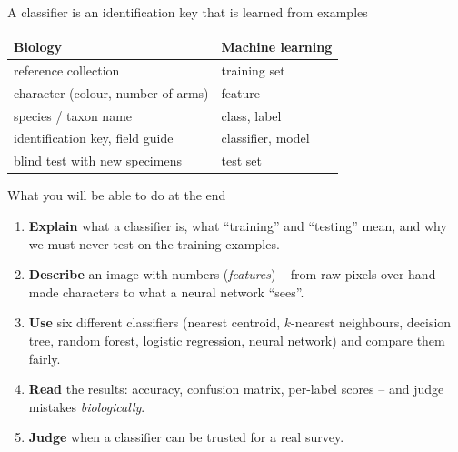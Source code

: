 \documentclass[aspectratio=169,11pt]{beamer}
\begin{document}
\begin{frame}{A classifier is an identification key that is learned from examples}
\centering
{}

\vspace{10pt}
\begin{tabularx}{0.9\linewidth}{@{}XX@{}}
\toprule
\textbf{Biology} & \textbf{Machine learning} \\
\midrule
reference collection & training set \\
character (colour, number of arms) & feature \\
species / taxon name & class, label \\
identification key, field guide & classifier, model \\
blind test with new specimens & test set \\
\bottomrule
\end{tabularx}
\end{frame}

\begin{frame}{What you will be able to do at the end}
\begin{enumerate}
  \item \textbf{Explain} what a classifier is, what ``training'' and ``testing'' mean, and why we must never test on the training examples.
  \item \textbf{Describe} an image with numbers (\emph{features}) -- from raw pixels over hand-made characters to what a neural network ``sees''.
  \item \textbf{Use} six different classifiers (nearest centroid, $k$-nearest neighbours, decision tree, random forest, logistic regression, neural network) and compare them fairly.
  \item \textbf{Read} the results: accuracy, confusion matrix, per-label scores -- and judge mistakes \emph{biologically}.
  \item \textbf{Judge} when a classifier can be trusted for a real survey.
\end{enumerate}
\vspace{4pt}
\end{frame}
\end{document}

